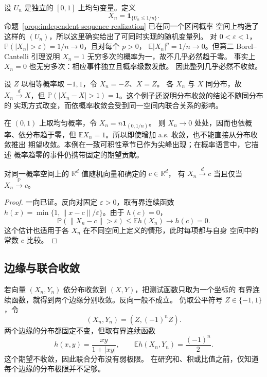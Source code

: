 \begin{example}[依概率收敛但不几乎必然收敛]
设 $U_n$ 是独立的 $[0,1]$ 上均匀变量。定义
\[
 X_n=\mathbf1_{\{U_n\le1/n\}}.
\]
命题~\ref{prop:independent-sequence-realization} 已在同一个区间概率
空间上构造了这样的 $(U_n)$，所以这里确实给出了可同时实现的随机变量列。
对 $0<\varepsilon<1$，
$\mathbb P(|X_n|>\varepsilon)=1/n\to0$，且对每个 $p>0$，
$\mathbb E|X_n|^p=1/n\to0$。但第二 Borel--Cantelli 引理说明
$X_n=1$ 无穷多次的概率为一，故不几乎必然趋于零。
事实上 $X_n=0$ 也无穷多次：相应事件独立且概率级数发散。
因此整列几乎必然不收敛。
\end{example}

\begin{example}[分布相同而误差不小]
设 $Z$ 以相等概率取 $-1,1$，令 $X_n=-Z$、$X=Z$。
各 $X_n$ 与 $X$ 同分布，故 $X_n\xrightarrow dX$，但
$\mathbb P(|X_n-X|>1)=1$。这个例子还说明分布收敛的结论不随同分布的
实现方式改变，而依概率收敛会受到同一空间内联合关系的影响。
\end{example}

\begin{example}[小概率的大幅度]
在 $(0,1)$ 上取均匀概率，令 $X_n=n\mathbf1_{(0,1/n)}$。
则 $X_n\to0$ 处处，因而也依概率、依分布趋于零，但
$\mathbb E X_n=1$。所以即使增加 a.s. 收敛，也不能直接从分布收敛推出
期望收敛。本例在一致可积性章节已作为尖峰出现；在概率语言中，它描述
概率趋零的事件仍携带固定的期望贡献。
\end{example}

\begin{theorem}[常数极限]
\label{thm:distribution-constant-probability}
对同一概率空间上的 $\mathbb R^d$ 值随机向量和确定的 $c\in\mathbb R^d$，
有 $X_n\xrightarrow dc$ 当且仅当 $X_n\xrightarrow{\mathbb P}c$。
\end{theorem}

\begin{proof}
一向已证。反向对固定 $\varepsilon>0$，取有界连续函数
$h(x)=\min\{1,\|x-c\|/\varepsilon\}$。由于 $h(c)=0$，
\[
 \mathbb P(\|X_n-c\|>\varepsilon)
 \le\mathbb E h(X_n)\longrightarrow h(c)=0.
\]
这个估计也适用于各 $X_n$ 在不同空间上定义的情形，此时每项都与自身
空间中的常数 $c$ 比较。
\end{proof}

\subsection{边缘与联合收敛}

若向量 $(X_n,Y_n)$ 依分布收敛到 $(X,Y)$，把测试函数只取为一个坐标的
有界连续函数，就得到两个边缘分别收敛。反向一般不成立。
仍取公平符号 $Z\in\{-1,1\}$，令
\[
 (X_n,Y_n)=(Z,(-1)^nZ).
\]
两个边缘的分布都固定不变，但取有界连续函数
\[
 h(x,y)=\frac{xy}{1+|xy|},\qquad
 \mathbb E h(X_n,Y_n)=\frac{(-1)^n}{2}.
\]
这个期望不收敛，因此联合分布没有弱极限。
在研究和、积或比值之前，仅知道每个边缘的分布极限并不足够。

